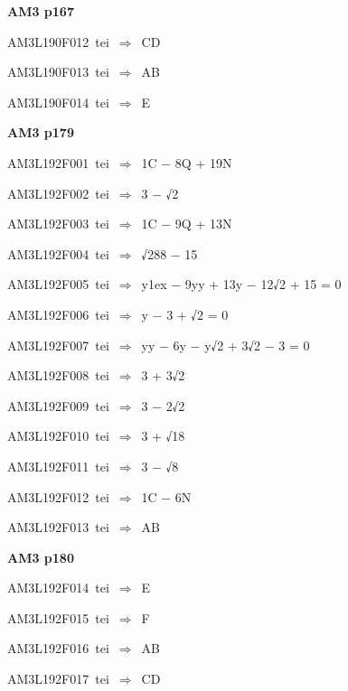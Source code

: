 \par\vfill\eject
{\bf\hfill AM3 p167\hfill\hbox{}}\par\bigskip
{\sixrm AM3L190F012\ {\sixit tei}\ }$\Rightarrow$\ CD\par\smallskip
{\sixrm AM3L190F013\ {\sixit tei}\ }$\Rightarrow$\ AB\par\smallskip
{\sixrm AM3L190F014\ {\sixit tei}\ }$\Rightarrow$\ E\par\smallskip

\par\vfill\eject
{\bf\hfill AM3 p179\hfill\hbox{}}\par\bigskip
{\sixrm AM3L192F001\ {\sixit tei}\ }$\Rightarrow$\ 1C − 8Q + 19N\par\smallskip
{\sixrm AM3L192F002\ {\sixit tei}\ }$\Rightarrow$\ 3 − √2\par\smallskip
{\sixrm AM3L192F003\ {\sixit tei}\ }$\Rightarrow$\ 1C − 9Q + 13N\par\smallskip
{\sixrm AM3L192F004\ {\sixit tei}\ }$\Rightarrow$\ √288 − 15\par\smallskip
{\sixrm AM3L192F005\ {\sixit tei}\ }$\Rightarrow$\ {\tenit y}\raise1ex\hbox{} − 9{\tenit yy} + 13{\tenit y} − 12√2 + 15 = 0\par\smallskip
{\sixrm AM3L192F006\ {\sixit tei}\ }$\Rightarrow$\ {\tenit y} − 3 + √2 = 0\par\smallskip
{\sixrm AM3L192F007\ {\sixit tei}\ }$\Rightarrow$\ {\tenit yy} − 6{\tenit y} − {\tenit y}√2 + 3√2 − 3 = 0\par\smallskip
{\sixrm AM3L192F008\ {\sixit tei}\ }$\Rightarrow$\ 3 + 3√2\par\smallskip
{\sixrm AM3L192F009\ {\sixit tei}\ }$\Rightarrow$\ 3 − 2√2\par\smallskip
{\sixrm AM3L192F010\ {\sixit tei}\ }$\Rightarrow$\ 3 + √18\par\smallskip
{\sixrm AM3L192F011\ {\sixit tei}\ }$\Rightarrow$\ 3 − √8\par\smallskip
{\sixrm AM3L192F012\ {\sixit tei}\ }$\Rightarrow$\ 1C − 6N\par\smallskip
{\sixrm AM3L192F013\ {\sixit tei}\ }$\Rightarrow$\ AB\par\smallskip

\par\vfill\eject
{\bf\hfill AM3 p180\hfill\hbox{}}\par\bigskip
{\sixrm AM3L192F014\ {\sixit tei}\ }$\Rightarrow$\ E\par\smallskip
{\sixrm AM3L192F015\ {\sixit tei}\ }$\Rightarrow$\ F\par\smallskip
{\sixrm AM3L192F016\ {\sixit tei}\ }$\Rightarrow$\ AB\par\smallskip
{\sixrm AM3L192F017\ {\sixit tei}\ }$\Rightarrow$\ CD\par\smallskip

